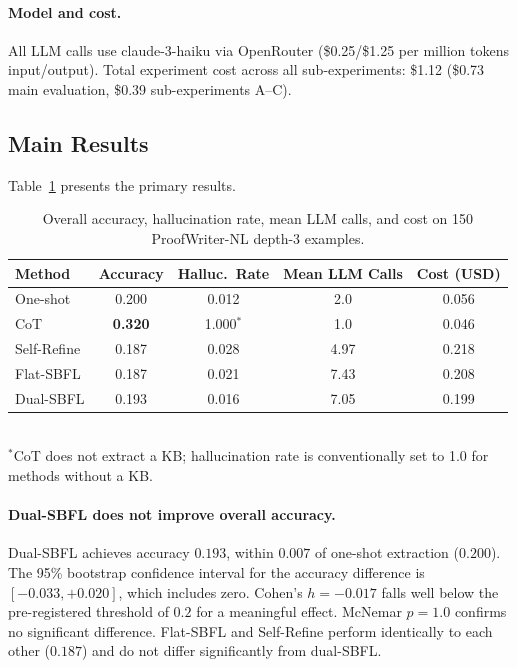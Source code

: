 \documentclass[11pt,letterpaper]{article}
\begin{document}
\paragraph{Model and cost.} All LLM calls use claude-3-haiku via OpenRouter (\$0.25/\$1.25 per million tokens input/output). Total experiment cost across all sub-experiments: \$1.12 (\$0.73 main evaluation, \$0.39 sub-experiments A--C).

\subsection{Main Results}

Table~\ref{tab:main} presents the primary results.

\begin{table}[!htbp]
  \centering
  \caption{Overall accuracy, hallucination rate, mean LLM calls, and cost on 150 ProofWriter-NL depth-3 examples.}
  \label{tab:main}
  \begin{tabular}{lcccc}
    \toprule
    Method & Accuracy & Halluc.\ Rate & Mean LLM Calls & Cost (USD) \\
    \midrule
    One-shot      & 0.200 & 0.012  & 2.0  & 0.056 \\
    CoT           & \textbf{0.320} & 1.000$^*$ & 1.0  & 0.046 \\
    Self-Refine   & 0.187 & 0.028  & 4.97 & 0.218 \\
    Flat-SBFL     & 0.187 & 0.021  & 7.43 & 0.208 \\
    Dual-SBFL     & 0.193 & 0.016  & 7.05 & 0.199 \\
    \bottomrule
  \end{tabular}
  \\[4pt]
  \small $^*$CoT does not extract a KB; hallucination rate is conventionally set to 1.0 for methods without a KB.
\end{table}

\paragraph{Dual-SBFL does not improve overall accuracy.} Dual-SBFL achieves accuracy $0.193$, within $0.007$ of one-shot extraction ($0.200$). The 95\% bootstrap confidence interval for the accuracy difference is $[-0.033, +0.020]$, which includes zero. Cohen's $h = -0.017$ falls well below the pre-registered threshold of $0.2$ for a meaningful effect. McNemar $p = 1.0$ confirms no significant difference. Flat-SBFL and Self-Refine perform identically to each other ($0.187$) and do not differ significantly from dual-SBFL.
\end{document}
